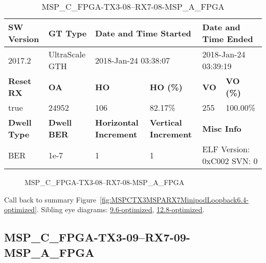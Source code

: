 \begin{table}[h]
\centering
\caption{MSP\_C\_FPGA-TX3-08--RX7-08-MSP\_A\_FPGA}
\label{tab:MSPCFPGATX308RX708MSPAFPGA6.4-optimized}
\begin{tabular}{@{}|l|l|l|l|l|l|@{}}
\toprule
\textbf{SW Version}                & \textbf{GT Type}   & \multicolumn{2}{l|}{\textbf{Date and Time Started}}            & \multicolumn{2}{l|}{\textbf{Date and Time Ended}}        \\ \midrule
2017.2                       & UltraScale GTH          & \multicolumn{2}{l|}{2018-Jan-24 03:38:07}                   & \multicolumn{2}{l|}{2018-Jan-24 03:39:19}               \\ \midrule
\textbf{Reset RX}                  & \textbf{OA} & \textbf{HO}   & \textbf{HO (\%)} & \textbf{VO} & \textbf{VO (\%)} \\ \midrule
true & 24952        & 106          & 82.17\%        & 255        & 100.00\%       \\ \midrule
\textbf{Dwell Type}                & \textbf{Dwell BER} & \textbf{Horizontal Increment} & \textbf{Vertical Increment}    & \multicolumn{2}{l|}{\textbf{Misc Info}}                  \\ \midrule
BER                            & 1e-7        & 1        & 1           & \multicolumn{2}{l|}{ELF Version: 0xC002 SVN: 0}                         \\ \bottomrule
\end{tabular}
\end{table}

\begin{figure}[h]
\caption{MSP\_C\_FPGA-TX3-08--RX7-08-MSP\_A\_FPGA} \label{fig:MSPCFPGATX308RX708MSPAFPGA6.4-optimized}
\end{figure}

Call back to summary Figure~\ref{fig:MSPCTX3MSPARX7MinipodLoopback6.4-optimized}.
Sibling eye diagrams: \hyperref[sec:MSPCFPGATX308RX708MSPAFPGA9.6-optimized]{9.6-optimized}, \hyperref[sec:MSPCFPGATX308RX708MSPAFPGA12.8-optimized]{12.8-optimized}.

\clearpage
\newpage


\subsection{MSP\_C\_FPGA-TX3-09--RX7-09-MSP\_A\_FPGA}\label{sec:MSPCFPGATX309RX709MSPAFPGA6.4-optimized}

